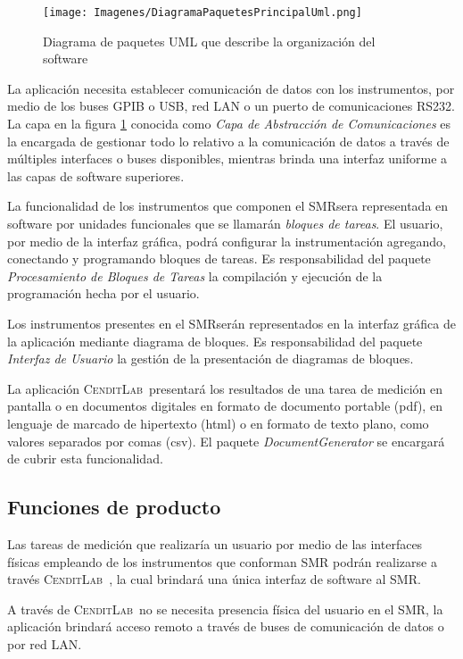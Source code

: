 \documentclass[paper=a4,oneside,fontsize=12pt]{scrartcl}
\newcommand{\AppName}{\textsc{CenditLab}\ }
\newcommand{\SMR}{SMR}
\begin{document}
	\begin{figure}[!h]
		\centering
		\texttt{[image: Imagenes/DiagramaPaquetesPrincipalUml.png]}
		\label{Fig:DiagramaPaquetesprincipalUml}
		\caption{Diagrama de paquetes UML que describe la organización del software}
	\end{figure}

	La aplicación necesita establecer comunicación de datos con los instrumentos, por medio de los buses GPIB o USB, red LAN o un puerto de comunicaciones RS232. La capa en la figura \ref{Fig:DiagramaPaquetesprincipalUml} conocida como \emph{Capa de Abstracción de Comunicaciones} es la encargada de gestionar todo lo relativo a la comunicación de datos a través de múltiples interfaces o buses disponibles, mientras brinda una interfaz uniforme a las capas de software superiores.
	
	La funcionalidad de los instrumentos que componen el \SMR sera representada en software por unidades funcionales que se llamarán  \emph{bloques de tareas}. El usuario, por medio de la interfaz gráfica, podrá configurar la instrumentación agregando, conectando y programando bloques de tareas. Es responsabilidad del paquete \emph{Procesamiento de Bloques de Tareas} la compilación y ejecución de la programación hecha por el usuario.
	
	Los instrumentos presentes en el \SMR serán representados en la interfaz gráfica de la aplicación mediante diagrama de bloques. Es responsabilidad del paquete \emph{Interfaz de Usuario} la gestión de la presentación de diagramas de bloques.
	
	La aplicación \AppName presentará los resultados de una tarea de medición en pantalla o en documentos digitales en formato de documento portable (pdf), en lenguaje de marcado de hipertexto (html) o en formato de texto plano, como valores separados por comas (csv). El paquete \emph{DocumentGenerator} se encargará de cubrir esta funcionalidad.
	
	\subsection{Funciones de producto}
	
	Las tareas de medición que realizaría un usuario por medio de las interfaces físicas empleando de los instrumentos que conforman \SMR 
	podrán realizarse a través \AppName, la cual brindará una única interfaz de software al \SMR. 
	
	A través de \AppName no se necesita presencia física del usuario en el \SMR, la aplicación brindará acceso remoto a través de buses de comunicación de datos o por red LAN. 
	
\end{document}
